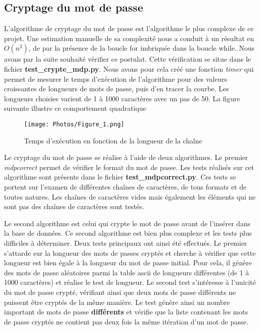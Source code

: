 \documentclass{article}
\begin{document}
\subsection{Cryptage du mot de passe}
L'algorithme de cryptage du mot de passe est l'algorithme le plus complexe de ce projet. Une estimation manuelle de sa complexité nous a conduit à un résultat en $O(n^2)$, de par la présence de la boucle for imbriquée dans la boucle while. Nous avons par la suite souhaité vérifier ce postulat. Cette vérification se situe dans le fichier \textbf{test\_crypte\_mdp.py}. Nous avons pour cela créé une fonction \textit{timer} qui permet de mesurer le temps d'exécution de l'algorithme pour des valeurs croissantes de longueurs de mots de passe, puis d'en tracer la courbe. Les longueurs choisies varient de 1 à 1000 caractères avec un pas de 50.
La figure suivante illustre ce comportement quadratique

\begin{figure}[h!]
    \centering
    \texttt{[image: Photos/Figure\_1.png]}
    \caption{Temps d'exécution en fonction de la longueur de la chaîne}
    \label{fig:my_label}
\end{figure} 

\vspace{6cm}

Le cryptage du mot de passe se réalise à l'aide de deux algorithmes. Le premier \textit{mdpcorrect} permet de vérifier le format du mot de passe. Les tests réalisés sur cet algorithme sont présents dans le fichier \textbf{test\_mdpcorrect.py}. Ces tests se portent sur l'examen de différentes chaînes de caractères, de tous formats et de toutes natures. Les chaînes de caractères vides mais également les éléments qui ne sont pas des chaînes de caractères sont testés.


Le second algorithme est celui qui crypte le mot de passe avant de l'insérer dans la base de données. Ce second algorithme est bien plus complexe et les tests plus difficiles à déterminer.
Deux tests principaux ont ainsi été effectués. Le premier s'attarde sur la longueur des mots de passes cryptés et cherche à vérifier que cette longueur est bien égale à la longueur du mot de passe initial. Pour cela, il génère des mots de passe aléatoires parmi la table ascii de longueurs différentes (de 1 à 1000 caractères) et réalise le test de longueur. Le second test s'intéresse à l'unicité du mot de passe crypté, vérifiant ainsi que deux mots de passe différents ne puissent être cryptés de la même manière. Le test génère ainsi un nombre important de mots de passe \textbf{différents} et vérifie que la liste contenant les mots de passe cryptés ne contient pas deux fois la même itération d'un mot de passe.
\end{document}
